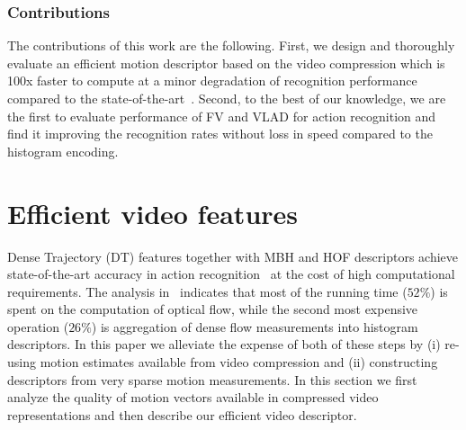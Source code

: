 \documentclass[10pt,twocolumn,letterpaper]{article}
\begin{document}
\subsubsection*{Contributions}
The contributions of this work are the following. First, we design and thoroughly evaluate an efficient motion descriptor based on the video compression which is 100x faster to compute at a minor degradation of recognition performance compared to the state-of-the-art~\cite{Wang12}. Second, to the best of our knowledge, we are the first to evaluate performance of FV and VLAD for action recognition and find it improving the recognition rates without loss in speed compared to the histogram encoding.

\section{Efficient video features}
\label{sec:features}

Dense Trajectory (DT) features together with MBH and HOF descriptors achieve state-of-the-art accuracy in action recognition~\cite{Wang12} at the cost of high computational requirements.
The analysis in~\cite{Wang12} indicates that most of the running time ($52\%$) is spent on the computation of optical flow, while the second most expensive operation ($26\%$) is aggregation of dense flow measurements into histogram descriptors. In this paper we alleviate the expense of both of these steps by (i) re-using motion estimates available from video compression and (ii) constructing descriptors from very sparse motion measurements. %
In this section we first analyze the quality of motion vectors available in compressed video representations and then describe our efficient video descriptor.

\end{document}
